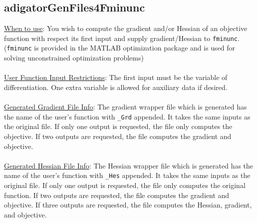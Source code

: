 \documentclass[10pt,pdftex]{article}
\begin{document}
\subsection{adigatorGenFiles4Fminunc}
\underline{When to use}: You wish to compute the gradient and/or Hessian of an objective function with respect its first input and supply gradient/Hessian to \texttt{fminunc}. (\texttt{fminunc} is provided in the MATLAB optimization package and is used for solving unconstrained optimization problems)\\\\
\underline{User Function Input Restrictions}: The first input must be the variable of differentiation. One extra variable is allowed for auxiliary data if desired.\\\\
\underline{Generated Gradient File Info}: The gradient wrapper file which is generated has the name of the user's function with \texttt{\_Grd} appended. It takes the same inputs as the original file. If only one output is requested, the file only computes the objective. If two outputs are requested, the file computes the gradient and objective.\\\\
\underline{Generated Hessian File Info}: The Hessian wrapper file which is generated has the name of the user's function with \texttt{\_Hes} appended. It takes the same inputs as the original file. If only one output is requested, the file only computes the original function. If two outputs are requested, the file computes the gradient and objective. If three outputs are requested, the file computes the Hessian, gradient, and objective.\\\\
\end{document}

